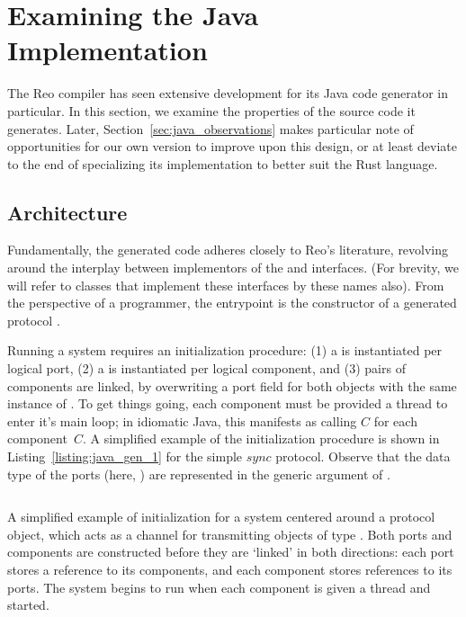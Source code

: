 \section{Examining the Java Implementation}
\label{sec:java_examined}
The Reo compiler has seen extensive development for its Java code generator in particular. In this section, we examine the properties of the source code it generates. Later, Section~\ref{sec:java_observations} makes particular note of opportunities for our own version to improve upon this design, or at least deviate to the end of specializing its implementation to better suit the Rust language.

\subsection{Architecture}
Fundamentally, the generated code adheres closely to Reo's literature, revolving around the interplay between implementors of the  and  interfaces. (For brevity, we will refer to classes that implement these interfaces by these names also). From the perspective of a programmer, the entrypoint is the constructor of a generated protocol .

Running a system requires an initialization procedure: (1) a  is instantiated per logical port, (2) a  is instantiated per logical component, and (3) pairs of components are linked, by overwriting a port field for both objects with the same instance of . To get things going, each component must be provided a thread to enter it's main loop; in idiomatic Java, this manifests as calling $C$ for each component~$C$. A simplified example of the initialization procedure is shown in Listing~\ref{listing:java_gen_1} for the simple $sync$ protocol. Observe that the data type of the ports (here, ) are represented in the generic argument of .


\begin{listing}[ht]
	\centering
	\inputminted[]{java}{java_gen_1.java}
	\caption[Reo-generated Java protocol initialization.]{A simplified example of initialization for a system centered around a  protocol object, which acts as a channel for transmitting objects of type . Both ports and components are constructed before they are `linked' in both directions: each port stores a reference to its components, and each component stores references to its ports. The system begins to run when each component is given a thread and started.}
	\label{listing:java_gen_1}
\end{listing}


